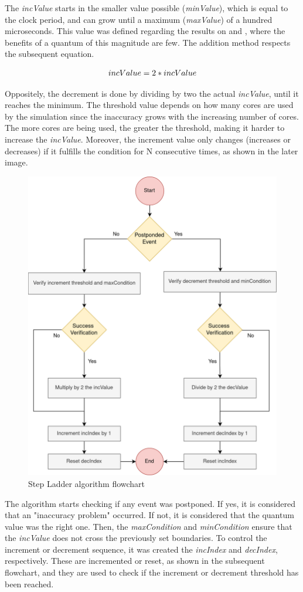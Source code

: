 The \textit{incValue} starts in the smaller value possible (\textit{minValue}), which is equal to the clock period, 
and can grow until a maximum (\textit{maxValue}) of a hundred microseconds.  
This value was defined regarding the results on \cite{pargem5} and \cite{BeyondQuantumTDSim}, where the benefits of a 
quantum of this magnitude are few. The addition method respects the subsequent equation.

\begin{equation}
    \label{eq_incValue}
    \centering
        \Large
        incValue = 2 * incValue
        \normalsize
\end{equation}
\vspace{0.3cm}

Oppositely, the decrement is done by dividing by two the actual \textit{incValue}, until it reaches the minimum. The threshold value depends on how 
many cores are used by the simulation since the inaccuracy grows with the increasing number of cores. The more cores are being used, the greater 
the threshold, making it harder to increase the \textit{incValue}. Moreover, the increment value only changes (increases or decreases) if it 
fulfills the condition for N consecutive times, as shown in the later image. 

\begin{figure}[H]
	\centering
 	\includegraphics[width=0.6\linewidth]{Images/incAlgorithm_flowchart.png}
 	\caption{Step Ladder algorithm flowchart}
	 \label{fig_incAlgorithm_flowchart}
\end{figure}

The algorithm starts checking if any event 
was postponed. If yes, it is considered that an "inaccuracy problem" occurred. If not, it is considered that the quantum value was the right one.
Then, the \textit{maxCondition} and \textit{minCondition} ensure that the \textit{incValue} does not cross the previously set boundaries. To control the 
increment or decrement sequence, it was created the \textit{incIndex} and \textit{decIndex}, respectively. These are incremented or reset, as 
shown in the subsequent flowchart, and they are used to check if the increment or decrement threshold has been reached.

